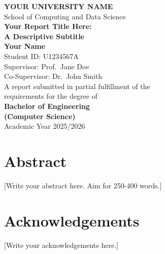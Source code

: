 
\begin{titlepage}
\begin{center}

\vspace*{2cm}

{\Large\textbf{YOUR UNIVERSITY NAME}}\\[0.5cm]
{\large School of Computing and Data Science}\\[2cm]

{\LARGE\textbf{Your Report Title Here:\\
A Descriptive Subtitle}}\\[2cm]

{\large
\textbf{Your Name}\\[0.5cm]
Student ID: U1234567A\\[1cm]
Supervisor: Prof.\ Jane Doe\\[0.5cm]
Co-Supervisor: Dr.\ John Smith\\[2cm]

A report submitted in partial fulfillment of the\\
requirements for the degree of\\[0.5cm]
\textbf{Bachelor of Engineering}\\
\textbf{(Computer Science)}\\[2cm]

Academic Year 2025/2026
}

\end{center}
\end{titlepage}

\chapter*{Abstract}

%

[Write your abstract here. Aim for 250-400 words.]

\newpage

\chapter*{Acknowledgements}

[Write your acknowledgements here.]

\newpage
